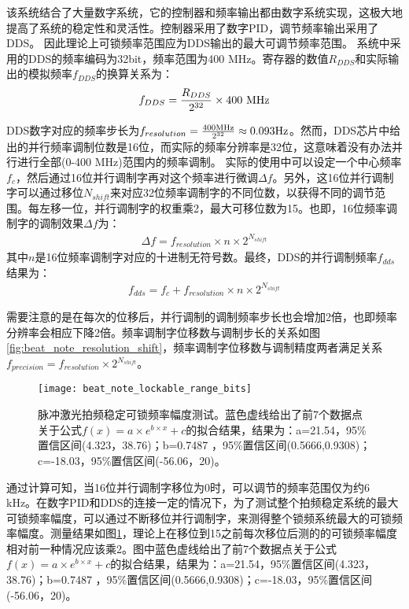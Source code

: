该系统结合了大量数字系统，它的控制器和频率输出都由数字系统实现，这极大地提高了系统的稳定性和灵活性。控制器采用了数字PID，调节频率输出采用了DDS。
因此理论上可锁频率范围应为DDS输出的最大可调节频率范围。
系统中采用的DDS的频率编码为32bit，频率范围为400 MHz。寄存器的数值$R_{DDS}$和实际输出的模拟频率$f_{DDS}$的换算关系为：
\begin{align}
    f_{DDS}=\frac{R_{DDS}}{2^{32}}\times 400\ \textnormal{MHz}
\end{align}

DDS数字对应的频率步长为$f_{resolution}=\frac{400\textnormal{MHz}}{2^{32}}\approx0.093\textnormal{Hz}$。然而，DDS芯片中给出的并行频率调制位数是16位，而实际的频率分辨率是32位，这意味着没有办法并行进行全部(0-400 MHz)范围内的频率调制。
实际的使用中可以设定一个中心频率$f_{c}$，然后通过16位并行调制字再对这个频率进行微调$\Delta f$。另外，这16位并行调制字可以通过移位$N_{shift}$来对应32位频率调制字的不同位数，以获得不同的调节范围。每左移一位，并行调制字的权重乘2，最大可移位数为15。也即，16位频率调制字的调制效果$\Delta f$为：
\begin{align}
    \Delta f=f_{resolution}\times n \times 2^{N_{shift}}
\end{align}
其中$n$是16位频率调制字对应的十进制无符号数。最终，DDS的并行调制频率$f_{dds}$结果为：
\begin{align}
    f_{dds}=f_c+f_{resolution}\times n \times 2^{N_{shift}}
\end{align}


需要注意的是在每次的位移后，并行调制的调制频率步长也会增加2倍，也即频率分辨率会相应下降2倍。频率调制字位移数与调制步长的关系如图\ref{fig:beat_note_resolution_shift}，频率调制字位移数与调制精度两者满足关系$f_{precision}=f_{resolution}\times2^{N_{shift}}$。



\begin{figure}
    \centering
    \texttt{[image: beat\_note\_lockable\_range\_bits]}
    \caption[脉冲激光拍频稳定可锁频率幅度测试]{脉冲激光拍频稳定可锁频率幅度测试。蓝色虚线给出了前7个数据点关于公式$f(x)=a\times e^{b\times x}+c$的拟合结果，结果为：a=21.54，95\%置信区间(4.323，38.76)；b=0.7487 ，95\%置信区间(0.5666,0.9308)；c=-18.03，95\%置信区间(-56.06，20)。\label{fig:beat_note_lockable_range_bits}}
\end{figure}


通过计算可知，当16位并行调制字移位为0时，可以调节的频率范围仅为约6 kHz。在数字PID和DDS的连接一定的情况下，为了测试整个拍频稳定系统的最大可锁频率幅度，可以通过不断移位并行调制字，来测得整个锁频系统最大的可锁频率幅度。测量结果如图\ref{fig:beat_note_lockable_range_bits}，理论上在移位到15之前每次移位后测的的可锁频率幅度相对前一种情况应该乘2。图中蓝色虚线给出了前7个数据点关于公式$f(x)=a\times e^{b\times x}+c$的拟合结果，结果为：a=21.54，95\%置信区间(4.323，38.76)；b=0.7487 ，95\%置信区间(0.5666,0.9308)；c=-18.03，95\%置信区间(-56.06，20)。


